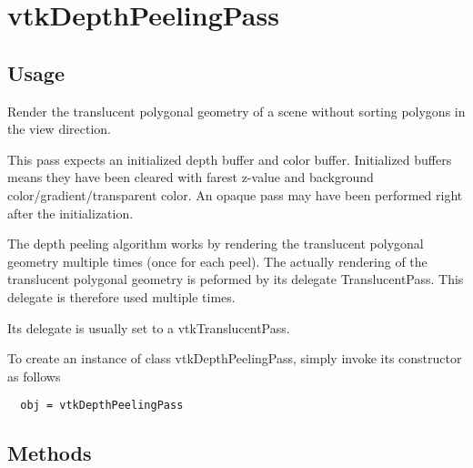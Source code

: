 \section{vtkDepthPeelingPass}

\subsection{Usage}

 Render the translucent polygonal geometry of a scene without sorting
 polygons in the view direction.

 This pass expects an initialized depth buffer and color buffer.
 Initialized buffers means they have been cleared with farest z-value and
 background color/gradient/transparent color.
 An opaque pass may have been performed right after the initialization.

 The depth peeling algorithm works by rendering the translucent polygonal
 geometry multiple times (once for each peel). The actually rendering of
 the translucent polygonal geometry is peformed by its delegate
 TranslucentPass. This delegate is therefore used multiple times.

 Its delegate is usually set to a vtkTranslucentPass.
 

To create an instance of class vtkDepthPeelingPass, simply
invoke its constructor as follows
\begin{verbatim}
  obj = vtkDepthPeelingPass
\end{verbatim}
\subsection{Methods}

